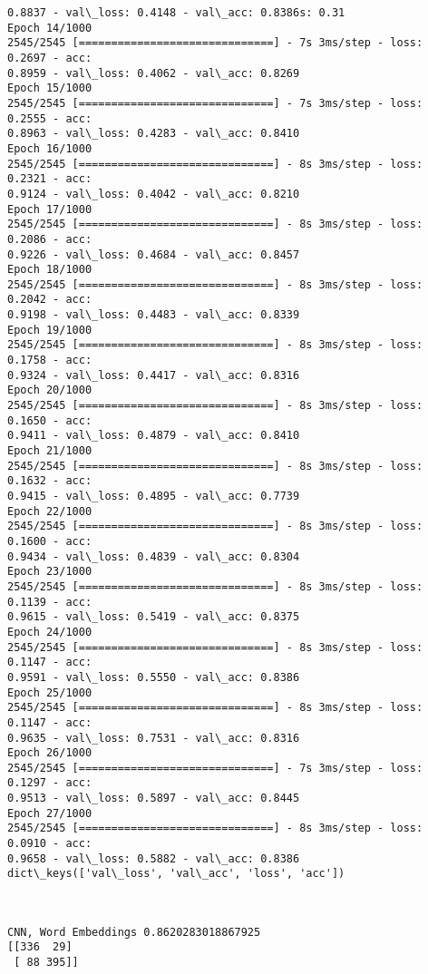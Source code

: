 \documentclass[11pt]{article}
\begin{document}
\begin{Verbatim}[commandchars=\\\{\}]
0.8837 - val\_loss: 0.4148 - val\_acc: 0.8386s: 0.31
Epoch 14/1000
2545/2545 [==============================] - 7s 3ms/step - loss: 0.2697 - acc:
0.8959 - val\_loss: 0.4062 - val\_acc: 0.8269
Epoch 15/1000
2545/2545 [==============================] - 7s 3ms/step - loss: 0.2555 - acc:
0.8963 - val\_loss: 0.4283 - val\_acc: 0.8410
Epoch 16/1000
2545/2545 [==============================] - 8s 3ms/step - loss: 0.2321 - acc:
0.9124 - val\_loss: 0.4042 - val\_acc: 0.8210
Epoch 17/1000
2545/2545 [==============================] - 8s 3ms/step - loss: 0.2086 - acc:
0.9226 - val\_loss: 0.4684 - val\_acc: 0.8457
Epoch 18/1000
2545/2545 [==============================] - 8s 3ms/step - loss: 0.2042 - acc:
0.9198 - val\_loss: 0.4483 - val\_acc: 0.8339
Epoch 19/1000
2545/2545 [==============================] - 8s 3ms/step - loss: 0.1758 - acc:
0.9324 - val\_loss: 0.4417 - val\_acc: 0.8316
Epoch 20/1000
2545/2545 [==============================] - 8s 3ms/step - loss: 0.1650 - acc:
0.9411 - val\_loss: 0.4879 - val\_acc: 0.8410
Epoch 21/1000
2545/2545 [==============================] - 8s 3ms/step - loss: 0.1632 - acc:
0.9415 - val\_loss: 0.4895 - val\_acc: 0.7739
Epoch 22/1000
2545/2545 [==============================] - 8s 3ms/step - loss: 0.1600 - acc:
0.9434 - val\_loss: 0.4839 - val\_acc: 0.8304
Epoch 23/1000
2545/2545 [==============================] - 8s 3ms/step - loss: 0.1139 - acc:
0.9615 - val\_loss: 0.5419 - val\_acc: 0.8375
Epoch 24/1000
2545/2545 [==============================] - 8s 3ms/step - loss: 0.1147 - acc:
0.9591 - val\_loss: 0.5550 - val\_acc: 0.8386
Epoch 25/1000
2545/2545 [==============================] - 8s 3ms/step - loss: 0.1147 - acc:
0.9635 - val\_loss: 0.7531 - val\_acc: 0.8316
Epoch 26/1000
2545/2545 [==============================] - 7s 3ms/step - loss: 0.1297 - acc:
0.9513 - val\_loss: 0.5897 - val\_acc: 0.8445
Epoch 27/1000
2545/2545 [==============================] - 8s 3ms/step - loss: 0.0910 - acc:
0.9658 - val\_loss: 0.5882 - val\_acc: 0.8386
dict\_keys(['val\_loss', 'val\_acc', 'loss', 'acc'])
\end{Verbatim}

    \begin{center}
    \end{center}
    { \hspace*{\fill} \\}
    
    \begin{Verbatim}[commandchars=\\\{\}]
CNN, Word Embeddings 0.8620283018867925
[[336  29]
 [ 88 395]]
\end{Verbatim}
\end{document}
